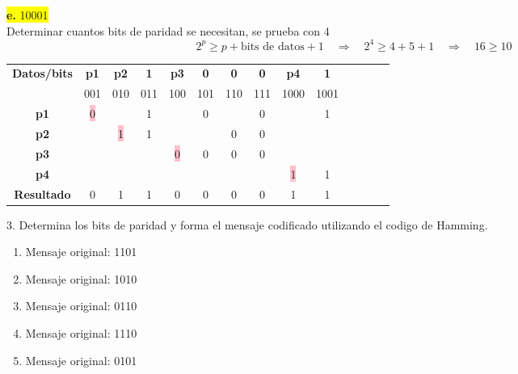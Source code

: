 \documentclass{article}
\begin{document}
	\begin{center}
		\hspace{3cm}\colorbox{yellow}{{\textbf{e.} 10001}}\newline
		\\Determinar cuantos bits de paridad se necesitan, se prueba con 4
		\[
		2^p \geq p + \text{bits de datos} + 1
		\quad \Rightarrow \quad	2^4 \geq 4 + 5 + 1 \quad \Rightarrow \quad 16 \geq 10
		\]
		
		\begin{table}[h!]
			\centering
			\begin{tabular}{c|ccccccccccccc}
				\toprule
				\textbf{Datos/bits} & \textbf{p1} & \textbf{p2} & \textbf{1} & \textbf{p3} & \textbf{0} & \textbf{0} & \textbf{0} & \textbf{p4} & \textbf{1}\\ & \scriptsize001 & \scriptsize010 & \scriptsize011 & \scriptsize100 & \scriptsize101 & \scriptsize110 & \scriptsize111 & \scriptsize1000 & \scriptsize1001\\
				\midrule
				\textbf{p1} & \colorbox{pink}{0} & & 1 & & 0 & & 0 & & 1\\
				\midrule
				\textbf{p2} &  & \colorbox{pink}{1} & 1 & & & 0 & 0 & & \\
				\midrule
				\textbf{p3} & & & & \colorbox{pink}{0} & 0 & 0 & 0 & & \\
				\midrule
				\textbf{p4} & & & & & & & & \colorbox{pink}{1} & 1\\
				\midrule
				\midrule
				\textbf{Resultado} & 0 & 1 & 1 & 0 & 0 & 0 & 0 & 1 & 1\\
				\bottomrule
			\end{tabular}
		\end{table}
	\end{center}
	3. Determina los bits de paridad y forma el mensaje codificado utilizando el codigo de
	Hamming.
	\begin{enumerate}
	\item Mensaje original: 1101
	\item Mensaje original: 1010
	\item Mensaje original: 0110
	\item Mensaje original: 1110
	\item Mensaje original: 0101
	\end{enumerate}
	
\end{document}
